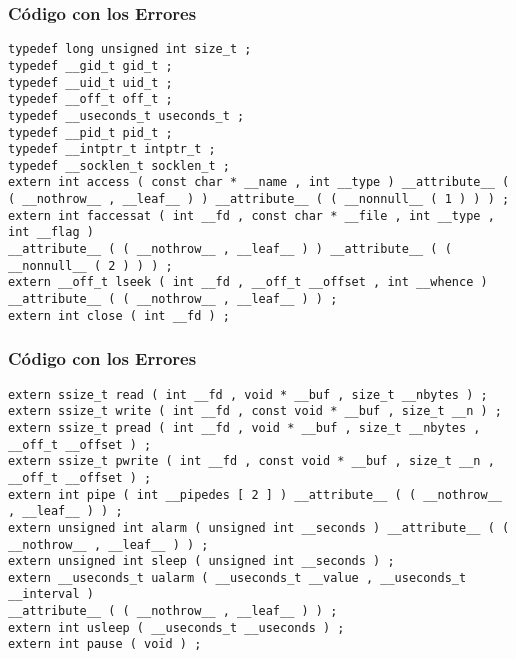 \documentclass{beamer}
\begin{document}
\begin{frame}[fragile]
\frametitle{C\'odigo con los Errores}
\begin{lstlisting}[style=CStyle]
typedef long unsigned int size_t ; 
typedef __gid_t gid_t ; 
typedef __uid_t uid_t ; 
typedef __off_t off_t ; 
typedef __useconds_t useconds_t ; 
typedef __pid_t pid_t ; 
typedef __intptr_t intptr_t ; 
typedef __socklen_t socklen_t ; 
extern int access ( const char * __name , int __type ) __attribute__ ( ( __nothrow__ , __leaf__ ) ) __attribute__ ( ( __nonnull__ ( 1 ) ) ) ; 
extern int faccessat ( int __fd , const char * __file , int __type , int __flag ) 
__attribute__ ( ( __nothrow__ , __leaf__ ) ) __attribute__ ( ( __nonnull__ ( 2 ) ) ) ; 
extern __off_t lseek ( int __fd , __off_t __offset , int __whence ) __attribute__ ( ( __nothrow__ , __leaf__ ) ) ; 
extern int close ( int __fd ) ; 
\end{lstlisting}
\end{frame}
\begin{frame}[fragile]
\frametitle{C\'odigo con los Errores}
\begin{lstlisting}[style=CStyle]
extern ssize_t read ( int __fd , void * __buf , size_t __nbytes ) ; 
extern ssize_t write ( int __fd , const void * __buf , size_t __n ) ; 
extern ssize_t pread ( int __fd , void * __buf , size_t __nbytes , 
__off_t __offset ) ; 
extern ssize_t pwrite ( int __fd , const void * __buf , size_t __n , 
__off_t __offset ) ; 
extern int pipe ( int __pipedes [ 2 ] ) __attribute__ ( ( __nothrow__ , __leaf__ ) ) ; 
extern unsigned int alarm ( unsigned int __seconds ) __attribute__ ( ( __nothrow__ , __leaf__ ) ) ; 
extern unsigned int sleep ( unsigned int __seconds ) ; 
extern __useconds_t ualarm ( __useconds_t __value , __useconds_t __interval ) 
__attribute__ ( ( __nothrow__ , __leaf__ ) ) ; 
extern int usleep ( __useconds_t __useconds ) ; 
extern int pause ( void ) ; 
\end{lstlisting}
\end{frame}
\end{document}
